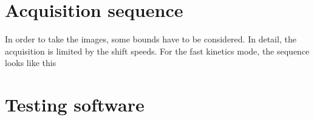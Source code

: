 \appendix
\chapter{Acquisition sequence}
In order to take the images, some bounds have to be considered. In detail, the acquisition is limited by the shift speeds.
For the fast kinetics mode, the sequence looks like this
\chapter{Testing software}